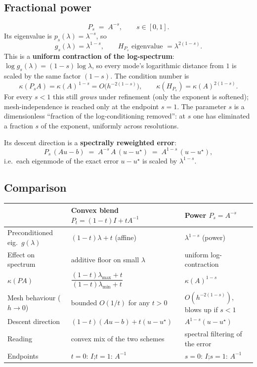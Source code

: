 \documentclass[11pt]{article}
\newcommand{\kk}{\kappa}
\newcommand{\ustar}{u^\star}
\begin{document}
\subsection{Fractional power}
\begin{equation}
  \boxed{\,P_s \;=\; A^{-s}, \qquad s\in[0,1].\,}
\end{equation}
Its eigenvalue is $p_s(\lambda)=\lambda^{-s}$, so
\begin{equation}
  g_s(\lambda) = \lambda^{1-s},
  \qquad
  \text{$H_{P_s}$ eigenvalue } = \lambda^{2(1-s)} .
\end{equation}
This is a \textbf{uniform contraction of the log-spectrum}: $\log g_s(\lambda) =
(1-s)\log\lambda$, so every mode's logarithmic distance from $1$ is scaled by the same
factor $(1-s)$. The condition number is
\begin{equation}
  \kk(P_sA) = \kk(A)^{\,1-s} = O\!\big(h^{-2(1-s)}\big),
  \qquad
  \kk(H_{P_s}) = \kk(A)^{2(1-s)} .
\end{equation}
For every $s<1$ this still \emph{grows} under refinement (only the exponent is softened);
mesh-independence is reached only at the endpoint $s=1$. The parameter $s$ is a
dimensionless ``fraction of the log-conditioning removed'': at $s$ one has eliminated a
fraction $s$ of the exponent, uniformly across resolutions.

Its descent direction is a \textbf{spectrally reweighted error}:
\begin{equation}
  P_s\,(Au-b) \;=\; A^{-s}\,A\,(u-\ustar) \;=\; A^{1-s}\,(u-\ustar),
\end{equation}
i.e.\ each eigenmode of the exact error $u-\ustar$ is scaled by $\lambda^{1-s}$.

\subsection{Comparison}

\begin{center}
\renewcommand{\arraystretch}{1.35}
\begin{tabular}{@{}lll@{}}
\toprule
 & \textbf{Convex blend } $P_t=(1-t)I+tA^{-1}$ & \textbf{Power } $P_s=A^{-s}$ \\
\midrule
Preconditioned eig.\ $g(\lambda)$ & $(1-t)\lambda + t$ (affine) & $\lambda^{1-s}$ (power) \\
Effect on spectrum & additive floor on small $\lambda$ & uniform log-contraction \\
$\kk(PA)$ & $\dfrac{(1-t)\lambda_{\max}+t}{(1-t)\lambda_{\min}+t}$ & $\kk(A)^{1-s}$ \\
Mesh behaviour ($h\to0$) & bounded $O(1/t)$ for any $t>0$ & $O(h^{-2(1-s)})$, blows up if $s<1$ \\
Descent direction & $(1-t)(Au-b)+t(u-\ustar)$ & $A^{1-s}(u-\ustar)$ \\
Reading & convex mix of the two schemes & spectral filtering of the error \\
Endpoints & $t=0:\,I$;\quad $t=1:\,A^{-1}$ & $s=0:\,I$;\quad $s=1:\,A^{-1}$ \\
\bottomrule
\end{tabular}
\end{center}
\end{document}
